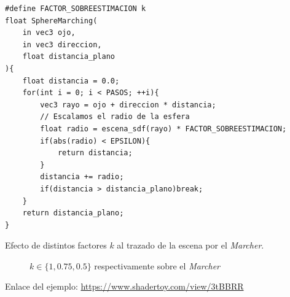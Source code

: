 \begin{lstlisting}
#define FACTOR_SOBREESTIMACION k
float SphereMarching(
    in vec3 ojo,
    in vec3 direccion, 
    float distancia_plano
){
    float distancia = 0.0;
    for(int i = 0; i < PASOS; ++i){
        vec3 rayo = ojo + direccion * distancia;
        // Escalamos el radio de la esfera
        float radio = escena_sdf(rayo) * FACTOR_SOBREESTIMACION;
        if(abs(radio) < EPSILON){
            return distancia;
        }
        distancia += radio;
        if(distancia > distancia_plano)break;
    }
    return distancia_plano;
}
\end{lstlisting}
Efecto de distintos factores \(k\) al trazado de la escena por el \textit{Marcher}.

\begin{figure}[H]
  \centering
  \captionsetup{justification=centering}%
  \hfill
  \hfill
  \caption{\(k\in\{1, 0.75, 0.5\}\) respectivamente sobre el \textit{Marcher}}
  \label{fig:twistk}
\end{figure}

Enlace del ejemplo:
\url{https://www.shadertoy.com/view/3tBBRR}


